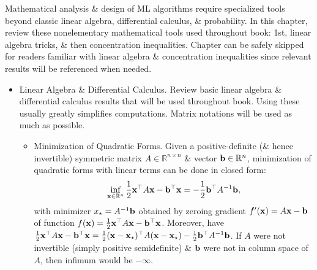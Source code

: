 \documentclass{article}
\begin{document}
\begin{enumerate}
\begin{itemize}
		Mathematical analysis \& design of ML algorithms require specialized tools beyond classic linear algebra, differential calculus, \& probability. In this chapter, review these nonelementary mathematical tools used throughout book: 1st, linear algebra tricks, \& then concentration inequalities. Chapter can be safely skipped for readers familiar with linear algebra \& concentration inequalities since relevant results will be referenced when needed.
		\begin{itemize}
			\item {\sf Linear Algebra \& Differential Calculus.} Review basic linear algebra \& differential calculus results that will be used throughout book. Using these usually greatly simplifies computations. Matrix notations will be used as much as possible.
			\begin{itemize}
				\item {\sf Minimization of Quadratic Forms.} Given a positive-definite (\& hence invertible) symmetric matrix $A\in\mathbb{R}^{n\times n}$ \& vector ${\bf b}\in\mathbb{R}^n$, minimization of quadratic forms with linear terms can be done in closed form:
				\begin{equation}
					\inf_{{\bf x}\in\mathbb{R}^n} \frac{1}{2}{\bf x}^\top A{\bf x} - {\bf b}^\top{\bf x} = -\frac{1}{2}{\bf b}^\top A^{-1}{\bf b},
				\end{equation}
				with minimizer $x_\star = A^{-1}{\bf b}$ obtained by zeroing gradient $f'({\bf x}) = A{\bf x} - {\bf b}$ of function $f({\bf x}) = \frac{1}{2}{\bf x}^\top A{\bf x} - {\bf b}^\top{\bf x}$. Moreover, have $\frac{1}{2}{\bf x}^\top A{\bf x} - {\bf b}^\top{\bf x} = \frac{1}{2}({\bf x} - {\bf x}_\star)^\top A({\bf x} - {\bf x}_\star) - \frac{1}{2}{\bf b}^\top A^{-1}{\bf b}$. If $A$ were not invertible (simply positive semidefinite) \& ${\bf b}$ were not in column space of $A$, then infimum would be $-\infty$.
				

\end{itemize}
\end{itemize}
\end{itemize}
\end{enumerate}
\end{document}
